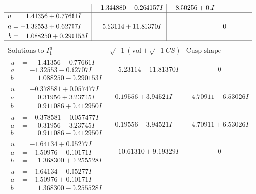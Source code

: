 \documentclass[1p]{elsarticle_modified}
\theoremstyle{definition}
\newcommand{\I}{\sqrt{-1}}
\begin{document}
$$\begin{array}{c|c|c}
 & -1.344880 - 0.264157 I & -8.50256 + 0. I\phantom{ +0.000000I} \\ \hline\begin{aligned}
u &= \phantom{-}1.41356 + 0.77661 I \\
a &= -1.32553 + 0.62707 I \\
b &= \phantom{-}1.088250 + 0.290153 I\end{aligned}
 & \phantom{-}5.23114 + 11.81370 I & \phantom{-0.000000 } 0\\
 \hline 
 \end{array}$$\newpage$$\begin{array}{c|c|c}  
\text{Solutions to }I^u_{1}& \I (\text{vol} + \sqrt{-1}CS) & \text{Cusp shape}\\
 \hline 
\begin{aligned}
u &= \phantom{-}1.41356 - 0.77661 I \\
a &= -1.32553 - 0.62707 I \\
b &= \phantom{-}1.088250 - 0.290153 I\end{aligned}
 & \phantom{-}5.23114 - 11.81370 I & \phantom{-0.000000 } 0 \\ \hline\begin{aligned}
u &= -0.378581 + 0.057477 I \\
a &= \phantom{-}0.31956 + 3.23745 I \\
b &= \phantom{-}0.911086 + 0.412950 I\end{aligned}
 & -0.19556 + 3.94521 I & -4.70911 - 6.53026 I \\ \hline\begin{aligned}
u &= -0.378581 - 0.057477 I \\
a &= \phantom{-}0.31956 - 3.23745 I \\
b &= \phantom{-}0.911086 - 0.412950 I\end{aligned}
 & -0.19556 - 3.94521 I & -4.70911 + 6.53026 I \\ \hline\begin{aligned}
u &= -1.64134 + 0.05277 I \\
a &= -1.50976 - 0.10171 I \\
b &= \phantom{-}1.368300 + 0.255528 I\end{aligned}
 & \phantom{-}10.61310 + 9.19329 I & \phantom{-0.000000 } 0 \\ \hline\begin{aligned}
u &= -1.64134 - 0.05277 I \\
a &= -1.50976 + 0.10171 I \\
b &= \phantom{-}1.368300 - 0.255528 I\end{aligned}

\end{array}$$
\end{document}
